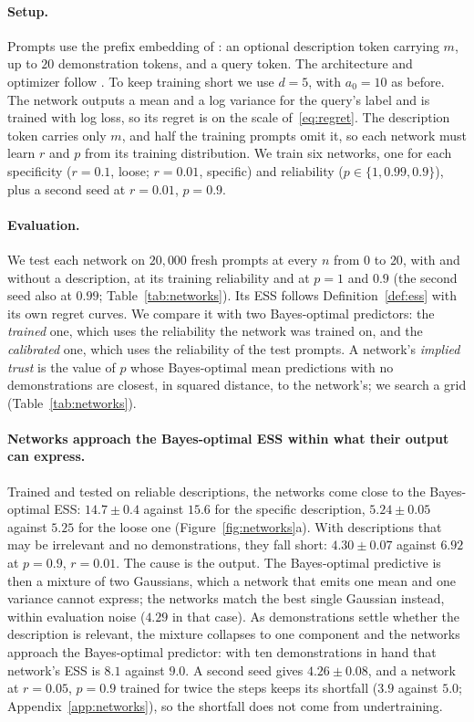 \documentclass{article}
\begin{document}
\paragraph{Setup.} Prompts use the prefix embedding of \citet{huangge2025}: an optional description token carrying $m$, up to $20$ demonstration tokens, and a query token. The architecture and optimizer follow \citet{garg2022}. To keep training short we use $d = 5$, with $a_0 = 10$ as before. The network outputs a mean and a log variance for the query's label and is trained with log loss, so its regret is on the scale of~\eqref{eq:regret}. The description token carries only $m$, and half the training prompts omit it, so each network must learn $r$ and $p$ from its training distribution. We train six networks, one for each specificity ($r = 0.1$, loose; $r = 0.01$, specific) and reliability ($p \in \{1, 0.99, 0.9\}$), plus a second seed at $r = 0.01$, $p = 0.9$.

\paragraph{Evaluation.} We test each network on $20{,}000$ fresh prompts at every $n$ from $0$ to $20$, with and without a description, at its training reliability and at $p = 1$ and $0.9$ (the second seed also at $0.99$; Table~\ref{tab:networks}). Its ESS follows Definition~\ref{def:ess} with its own regret curves. We compare it with two Bayes-optimal predictors: the \emph{trained} one, which uses the reliability the network was trained on, and the \emph{calibrated} one, which uses the reliability of the test prompts. A network's \emph{implied trust} is the value of $p$ whose Bayes-optimal mean predictions with no demonstrations are closest, in squared distance, to the network's; we search a grid (Table~\ref{tab:networks}).

\paragraph{Networks approach the Bayes-optimal ESS within what their output can express.} Trained and tested on reliable descriptions, the networks come close to the Bayes-optimal ESS: $14.7 \pm 0.4$ against $15.6$ for the specific description, $5.24 \pm 0.05$ against $5.25$ for the loose one (Figure~\ref{fig:networks}a). With descriptions that may be irrelevant and no demonstrations, they fall short: $4.30 \pm 0.07$ against $6.92$ at $p = 0.9$, $r = 0.01$. The cause is the output. The Bayes-optimal predictive is then a mixture of two Gaussians, which a network that emits one mean and one variance cannot express; the networks match the best single Gaussian instead, within evaluation noise ($4.29$ in that case). As demonstrations settle whether the description is relevant, the mixture collapses to one component and the networks approach the Bayes-optimal predictor: with ten demonstrations in hand that network's ESS is $8.1$ against $9.0$. A second seed gives $4.26 \pm 0.08$, and a network at $r = 0.05$, $p = 0.9$ trained for twice the steps keeps its shortfall ($3.9$ against $5.0$; Appendix~\ref{app:networks}), so the shortfall does not come from undertraining.
\end{document}

